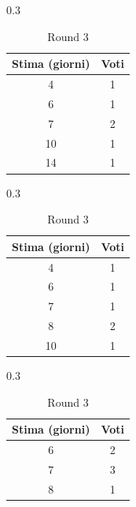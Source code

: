 \documentclass[a4paper,12pt]{article}
\begin{document}
\begin{table}[!htb]
    \footnotesize
    \centering
    
    \begin{subtable}[t]{0.3\textwidth}
        \centering
        \begin{tabular}[t]{|c|c|}
            \hline
            \textbf{Stima (giorni)} & \textbf{Voti} \\
            \hline
            4 & 1          \\
            \hline
            6 & 1             \\
            \hline
            7 & 2             \\
            \hline
            10 & 1              \\
            \hline
            14 & 1             \\    
            \hline
        \end{tabular}
        \caption{Round 1}
    \end{subtable}
    \hfill
    \begin{subtable}[t]{0.3\textwidth}
        \centering
        \begin{tabular}[t]{|c|c|}
            \hline
            \textbf{Stima (giorni)} & \textbf{Voti} \\
            \hline
            4 & 1          \\
            \hline
            6 & 1             \\
            \hline
            7 & 1             \\
            \hline
            8 & 2              \\
            \hline
            10 & 1             \\    
            \hline
        \end{tabular}
        \caption{Round 2}
    \end{subtable}
    \hfill
    \begin{subtable}[t]{0.3\textwidth}
        \centering
        \begin{tabular}[t]{|c|c|}
            \hline
            \textbf{Stima (giorni)} & \textbf{Voti} \\
            \hline
            6 & 2             \\
            \hline
            7 & 3             \\
            \hline
            8 & 1             \\
            \hline
        \end{tabular}
        \caption{Round 3}
    \end{subtable}
\end{table}
\end{document}
